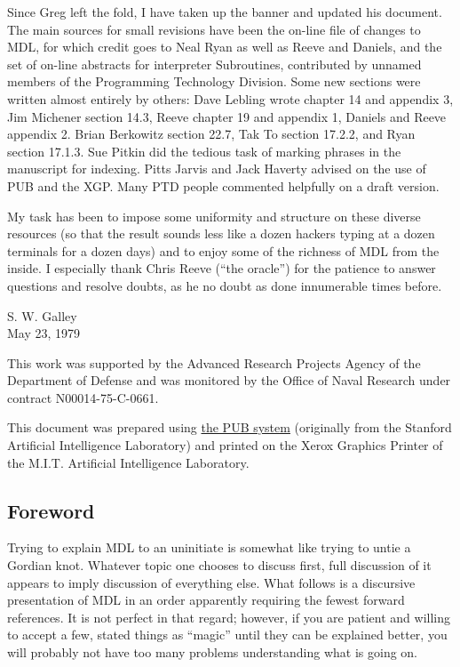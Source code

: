 \documentclass[a4paper,]{article}
\begin{document}
Since Greg left the fold, I have taken up the banner and updated his document. The main sources for small revisions have
been the on-line file of changes to MDL, for which credit goes to Neal Ryan as well as Reeve and Daniels, and the set of
on-line abstracts for interpreter Subroutines, contributed by unnamed members of the Programming Technology Division. Some
new sections were written almost entirely by others: Dave Lebling wrote chapter 14 and appendix 3, Jim Michener section
14.3, Reeve chapter 19 and appendix 1, Daniels and Reeve appendix 2. Brian Berkowitz section 22.7, Tak To section 17.2.2,
and Ryan section 17.1.3. Sue Pitkin did the tedious task of marking phrases in the manuscript for indexing. Pitts Jarvis
and Jack Haverty advised on the use of PUB and the XGP. Many PTD people commented helpfully on a draft version.

My task has been to impose some uniformity and structure on these diverse resources (so that the result sounds less like a
dozen hackers typing at a dozen terminals for a dozen days) and to enjoy some of the richness of MDL from the inside. I
especially thank Chris Reeve (``the oracle'') for the patience to answer questions and resolve doubts, as he no doubt as
done innumerable times before.

S. W. Galley\\
May 23, 1979

This work was supported by the Advanced Research Projects Agency of the Department of Defense and was monitored by the
Office of Naval Research under contract N00014-75-C-0661.

This document was prepared using \href{http://www.nomodes.com/pub_manual.html}{the PUB system} (originally from the
Stanford Artificial Intelligence Laboratory) and printed on the Xerox Graphics Printer of the M.I.T. Artificial
Intelligence Laboratory.

\subsection{Foreword}\label{foreword}

Trying to explain MDL to an uninitiate is somewhat like trying to untie a Gordian knot. Whatever topic one chooses to
discuss first, full discussion of it appears to imply discussion of everything else. What follows is a discursive
presentation of MDL in an order apparently requiring the fewest forward references. It is not perfect in that regard;
however, if you are patient and willing to accept a few, stated things as ``magic'' until they can be explained better, you
will probably not have too many problems understanding what is going on.
\end{document}
